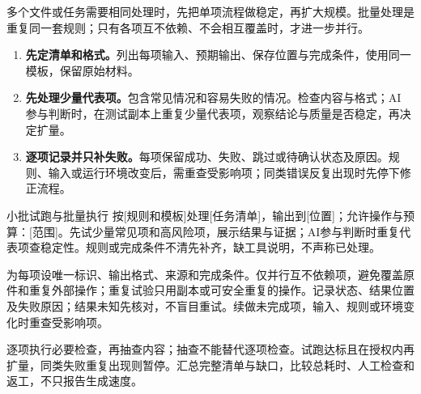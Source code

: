 多个文件或任务需要相同处理时，先把单项流程做稳定，再扩大规模。批量处理是重复同一套规则；只有各项互不依赖、不会相互覆盖时，才进一步并行。
\begin{enumerate}
\item \textbf{先定清单和格式。}列出每项输入、预期输出、保存位置与完成条件，使用同一模板，保留原始材料。
\item \textbf{先处理少量代表项。}包含常见情况和容易失败的情况。检查内容与格式；AI 参与判断时，在测试副本上重复少量代表项，观察结论与质量是否稳定，再决定扩量。
\item \textbf{逐项记录并只补失败。}每项保留成功、失败、跳过或待确认状态及原因。规则、输入或运行环境改变后，需重查受影响项；同类错误反复出现时先停下修正流程。
\end{enumerate}
\begin{prompt}{小批试跑与批量执行}
按[规则和模板]处理[任务清单]，输出到[位置]；允许操作与预算：[范围]。先试少量常见项和高风险项，展示结果与证据；AI参与判断时重复代表项查稳定性。规则或完成条件不清先补齐，缺工具说明，不声称已处理。\par
为每项设唯一标识、输出格式、来源和完成条件。仅并行互不依赖项，避免覆盖原件和重复外部操作；重复试验只用副本或可安全重复的操作。记录状态、结果位置及失败原因；结果未知先核对，不盲目重试。续做未完成项，输入、规则或环境变化时重查受影响项。\par
逐项执行必要检查，再抽查内容；抽查不能替代逐项检查。试跑达标且在授权内再扩量，同类失败重复出现则暂停。汇总完整清单与缺口，比较总耗时、人工检查和返工，不只报告生成速度。
\end{prompt}
